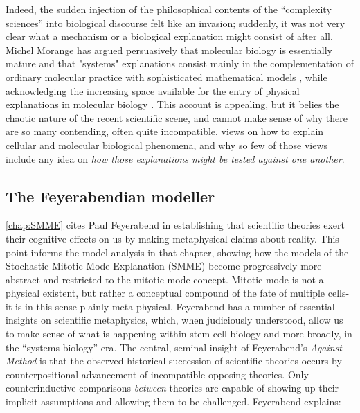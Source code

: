\documentclass{ut-thesis}
\begin{document}
\begin{NoHyper}
Indeed, the sudden injection of the philosophical contents of the ``complexity sciences'' into biological discourse felt like an invasion; suddenly, it was not very clear what a mechanism or a biological explanation might consist of after all. Michel Morange has argued persuasively that molecular biology is essentially mature \cite{Morange2003} and that "systems" explanations consist mainly in the complementation of ordinary molecular practice with sophisticated mathematical models \cite{Morange2008}, while acknowledging the increasing space available for the entry of physical explanations in molecular biology \cite{Morange2011}. This account is appealing, but it belies the chaotic nature of the recent scientific scene, and cannot make sense of why there are so many contending, often quite incompatible, views on how to explain cellular and molecular biological phenomena, and why so few of those views include any idea on \textit{how those explanations might be tested against one another}.

\subsection{The Feyerabendian modeller}
\label{sec:Feyerabend}
\autoref{chap:SMME} cites Paul Feyerabend in establishing that scientific theories exert their cognitive effects on us by making metaphysical claims about reality. This point informs the model-analysis in that chapter, showing how the models of the Stochastic Mitotic Mode Explanation (SMME) become progressively more abstract and restricted to the mitotic mode concept. Mitotic mode is not a physical existent, but rather a conceptual compound of the fate of multiple cells- it is in this sense plainly meta-physical. Feyerabend has a number of essential insights on scientific metaphysics, which, when judiciously understood, allow us to make sense of what is happening within stem cell biology and more broadly, in the ``systems biology'' era. The central, seminal insight of Feyerabend's \textit{Against Method} is that the observed historical succession of scientific theories occurs by counterpositional advancement of incompatible opposing theories. Only counterinductive comparisons \textit{between} theories are capable of showing up their implicit assumptions and allowing them to be challenged. Feyerabend explains:


\end{NoHyper}
\end{document}
